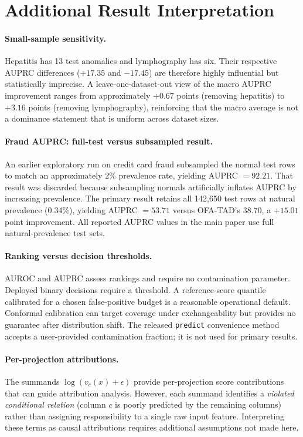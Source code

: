 \documentclass{article}
\begin{document}
\section{Additional Result Interpretation}
\label{app:additional-interp}

\paragraph{Small-sample sensitivity.}
Hepatitis has 13 test anomalies and lymphography has six. Their respective AUPRC differences ($+17.35$ and $-17.45$) are therefore highly influential but statistically imprecise. A leave-one-dataset-out view of the macro AUPRC improvement ranges from approximately $+0.67$ points (removing hepatitis) to $+3.16$ points (removing lymphography), reinforcing that the macro average is not a dominance statement that is uniform across dataset sizes.

\paragraph{Fraud AUPRC: full-test versus subsampled result.}
An earlier exploratory run on credit card fraud subsampled the normal test rows to match an approximately 2\% prevalence rate, yielding AUPRC $= 92.21$. That result was discarded because subsampling normals artificially inflates AUPRC by increasing prevalence. The primary result retains all 142{,}650 test rows at natural prevalence (0.34\%), yielding AUPRC $= 53.71$ versus OFA-TAD's $38.70$, a $+15.01$ point improvement. All reported AUPRC values in the main paper use full natural-prevalence test sets.

\paragraph{Ranking versus decision thresholds.}
AUROC and AUPRC assess rankings and require no contamination parameter. Deployed binary decisions require a threshold. A reference-score quantile calibrated for a chosen false-positive budget is a reasonable operational default. Conformal calibration can target coverage under exchangeability but provides no guarantee after distribution shift. The released \texttt{predict} convenience method accepts a user-provided contamination fraction; it is not used for primary results.

\paragraph{Per-projection attributions.}
The summands $\log(v_c(x) + \epsilon)$ provide per-projection score contributions that can guide attribution analysis. However, each summand identifies a \emph{violated conditional relation} (column $c$ is poorly predicted by the remaining columns) rather than assigning responsibility to a single raw input feature. Interpreting these terms as causal attributions requires additional assumptions not made here.
\end{document}
